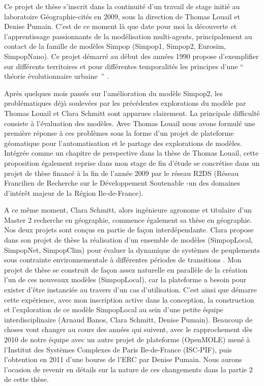 Ce projet de thèse s'inscrit dans la continuité d'un travail de stage initié au laboratoire Géographie-cités en 2009, sous la direction de Thomas Louail et Denise Pumain. C'est de ce moment là que date pour moi la découverte et l'apprentissage passionnants de la modélisation multi-agents, principalement au contact de la famille de modèles Simpop (Simpop1, Simpop2, Eurosim, SimpopNano). Ce projet démarré au début des années 1990 propose d'exemplifier sur différents territoires et pour différentes temporalités les principes d'une \enquote{ théorie évolutionnaire urbaine } \autocite{Pumain1997}.⁠⁠ 

Après quelques mois passés sur l'amélioration du modèle Simpop2, les problématiques déjà soulevées par les précédentes explorations du modèle par Thomas Louail et Clara Schmitt sont apparues clairement. La principale difficulté consiste à l’évaluation des modèles. Avec Thomas Louail nous avons formulé une première réponse à ces problèmes sous la forme d'un projet de plateforme géomatique pour l'automatisation et le partage des explorations de modèles. Intégrée comme un chapitre de perspective dans la thèse de Thomas Louail, cette proposition également reprise dans mon stage de fin d'étude se concrétise dans un projet de thèse financé à la fin de l'année 2009 \autocite{Rey2009} par le réseau R2DS (Réseau Francilien de Recherche sur le Développement Soutenable -un des domaines d’intérêt majeur de la Région Ile-de-France).

A ce même moment, Clara Schmitt, alors ingénieure agronome et titulaire d'un Master 2 recherche en géographie, commence également sa thèse en géographie. Nos deux projets sont conçus en partie de façon interdépendante. Clara propose dans son projet de thèse la réalisation d'un ensemble de modèles (SimpopLocal, SimpopNet, SimpopClim) pour évaluer la dynamique de systèmes de peuplements sous contrainte environnementale à différentes périodes de transitions \autocite{Schmitt2014}⁠. ⁠Mon projet de thèse se construit de façon assez naturelle en parallèle de la création l'un de ces nouveaux modèles (SimpopLocal), car la plateforme a besoin pour exister d'être instanciée au travers d'un cas d'utilisation. C'est ainsi que démarre cette expérience, avec mon inscription active dans la conception, la construction et l'exploration de ce modèle SimpopLocal au sein d'une petite équipe interdisciplinaire (Arnaud Banos, Clara Schmitt, Denise Pumain). Beaucoup de choses vont changer au cours des années qui suivent, avec le rapprochement dès 2010 de notre équipe avec un autre projet de plateforme (OpenMOLE) mené à l'Institut des Systèmes Complexes de Paris Ile-de-France (ISC-PIF), puis l'obtention en 2011 d'une bourse de l’ERC par Denise Pumain. Nous aurons l'ocasion de revenir en détails sur la nature de ces changements dans la partie 2 de cette thèse.

